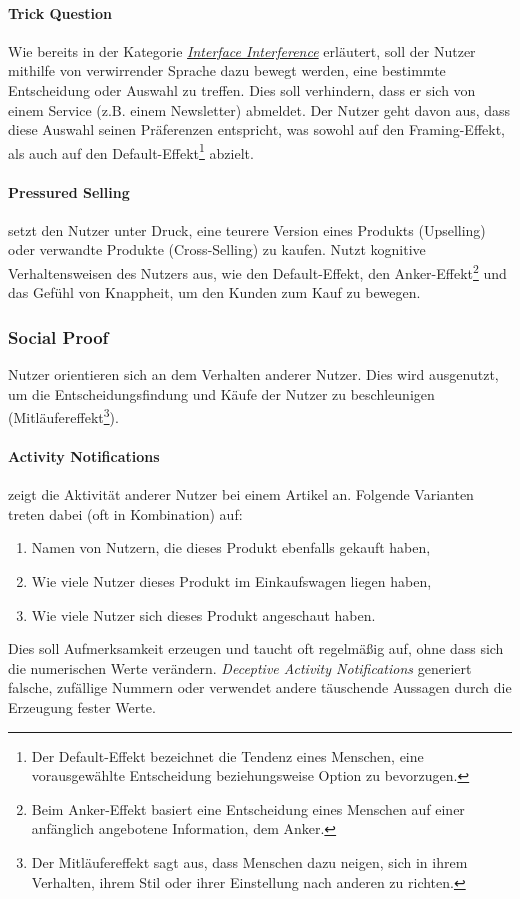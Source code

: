 \documentclass[a4paper]{article}
\begin{document}
\paragraph{Trick Question}
\label{para:trick_question}
Wie bereits in der Kategorie \hyperref[sssec:interface_interference]{\textit{Interface Interference}} erläutert, soll der Nutzer mithilfe von verwirrender Sprache dazu bewegt werden, eine bestimmte Entscheidung oder Auswahl zu treffen. Dies soll verhindern, dass er sich von einem Service (z.B. einem Newsletter) abmeldet. Der Nutzer geht davon aus, dass diese Auswahl seinen Präferenzen entspricht, was sowohl auf den Framing-Effekt, als auch auf den Default-Effekt\footnote{\label{foot:6} Der Default-Effekt bezeichnet die Tendenz eines Menschen, eine vorausgewählte Entscheidung beziehungsweise Option zu bevorzugen.} abzielt.

\paragraph{Pressured Selling}
\label{para:pressured_selling}
setzt den Nutzer unter Druck, eine teurere Version eines Produkts (Upselling) oder verwandte Produkte (Cross-Selling) zu kaufen. Nutzt kognitive Verhaltensweisen des Nutzers aus, wie den Default-Effekt, den Anker-Effekt\footnote{\label{foot:7} Beim Anker-Effekt basiert eine Entscheidung eines Menschen auf einer anfänglich angebotene Information, dem \glqq Anker\grqq{}.} und das Gefühl von Knappheit, um den Kunden zum Kauf zu bewegen.

\subsubsection{Social Proof}
\label{sssec:social_proof}
Nutzer orientieren sich an dem Verhalten anderer Nutzer. Dies wird ausgenutzt, um die Entscheidungsfindung und Käufe der Nutzer zu beschleunigen (Mitläufereffekt\footnote{\label{foot:5} Der Mitläufereffekt sagt aus, dass Menschen dazu neigen, sich in ihrem Verhalten, ihrem Stil oder ihrer Einstellung nach anderen zu richten.}).

\paragraph{Activity Notifications}
\label{para:activity_notifications}
zeigt die Aktivität anderer Nutzer bei einem Artikel an. Folgende Varianten treten dabei (oft in Kombination) auf: 
\begin{enumerate}[label=\arabic*)]
	\item{Namen von Nutzern, die dieses Produkt ebenfalls gekauft haben,}
	\item{Wie viele Nutzer dieses Produkt im Einkaufswagen liegen haben,}
	\item{Wie viele Nutzer sich dieses Produkt angeschaut haben.}
\end{enumerate}
Dies soll Aufmerksamkeit erzeugen und taucht oft regelmäßig auf, ohne dass sich die numerischen Werte verändern. \textit{Deceptive Activity Notifications} generiert falsche, zufällige Nummern oder verwendet andere täuschende Aussagen durch die Erzeugung fester Werte.
\end{document}
